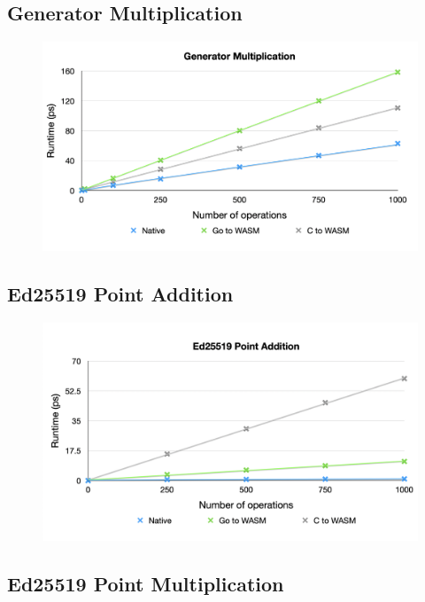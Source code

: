 \documentclass[11pt, a4paper, twoside, openright]{article}
\begin{document}
\subsection{Generator Multiplication}

\begin{figure}[H]
 \centering
  \includegraphics[width=14cm]{gen_mul.png}
\end{figure}


\subsection{Ed25519 Point Addition}

\begin{figure}[H]
 \centering
  \includegraphics[width=14cm]{point_add.png}
\end{figure}



\subsection{Ed25519 Point Multiplication}
\end{document}
